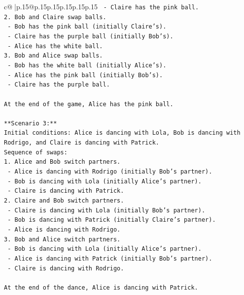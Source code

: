 \documentclass{article}
\begin{document}
{\begin{supertabular}{c@{$\;$}|p{.15\linewidth}@{}p{.15\linewidth}p{.15\linewidth}p{.15\linewidth}p{.15\linewidth}p{.15\linewidth}}
{{{\texttt{   {-} Claire has the pink ball.} \\
\texttt{2. Bob and Claire swap balls.} \\
\texttt{   {-} Bob has the pink ball (initially Claire's).} \\
\texttt{   {-} Claire has the purple ball (initially Bob's).} \\
\texttt{   {-} Alice has the white ball.} \\
\texttt{3. Bob and Alice swap balls.} \\
\texttt{   {-} Bob has the white ball (initially Alice's).} \\
\texttt{   {-} Alice has the pink ball (initially Bob's).} \\
\texttt{   {-} Claire has the purple ball.} \\
\\ 
\texttt{At the end of the game, Alice has the pink ball.} \\
\\ 
\texttt{**Scenario 3:**} \\
\texttt{Initial conditions: Alice is dancing with Lola, Bob is dancing with Rodrigo, and Claire is dancing with Patrick.} \\
\texttt{Sequence of swaps:} \\
\texttt{1. Alice and Bob switch partners.} \\
\texttt{   {-} Alice is dancing with Rodrigo (initially Bob's partner).} \\
\texttt{   {-} Bob is dancing with Lola (initially Alice's partner).} \\
\texttt{   {-} Claire is dancing with Patrick.} \\
\texttt{2. Claire and Bob switch partners.} \\
\texttt{   {-} Claire is dancing with Lola (initially Bob's partner).} \\
\texttt{   {-} Bob is dancing with Patrick (initially Claire's partner).} \\
\texttt{   {-} Alice is dancing with Rodrigo.} \\
\texttt{3. Bob and Alice switch partners.} \\
\texttt{   {-} Bob is dancing with Lola (initially Alice's partner).} \\
\texttt{   {-} Alice is dancing with Patrick (initially Bob's partner).} \\
\texttt{   {-} Claire is dancing with Rodrigo.} \\
\\ 
\texttt{At the end of the dance, Alice is dancing with Patrick.} \\
}}}
\end{supertabular}}
\end{document}
